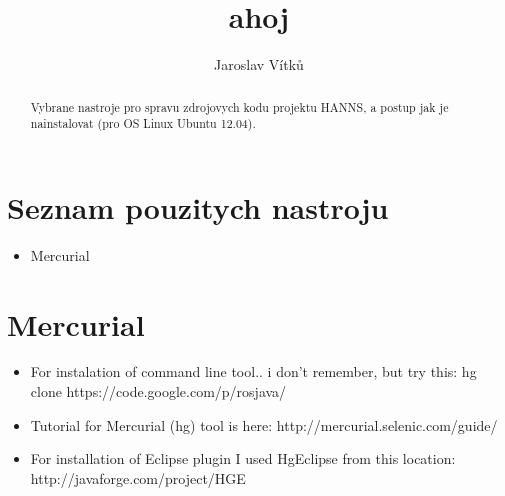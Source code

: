 \documentclass[journal,onecolumn]{IEEEtrancz}
\begin{document}
\title{ahoj}
\author{Jaroslav Vítků}

\maketitle

\begin{abstract}
Vybrane nastroje pro spravu zdrojovych kodu projektu HANNS, a postup jak je nainstalovat (pro OS Linux Ubuntu 12.04).
\end{abstract}

\IEEEpeerreviewmaketitle



\section{Seznam pouzitych nastroju}


\begin{itemize}
	\item Mercurial


\end{itemize}
\section{Mercurial}


\begin{itemize}
	\item For instalation of command line tool.. i don't remember, but try this: hg clone https://code.google.com/p/rosjava/ 
	\item Tutorial for Mercurial (hg) tool is here: http://mercurial.selenic.com/guide/
		\vspace{3mm}
	\item For installation of Eclipse plugin I used HgEclipse from this location: http://javaforge.com/project/HGE
\end{itemize}
\end{document}
